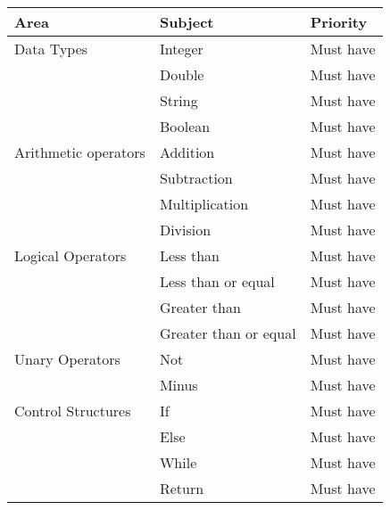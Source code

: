 \begin{table}[H]
\begin{tabular}{@{}lll@{}}
\toprule
\textbf{Area}          & \textbf{Subject}      & \textbf{Priority}               \\ \midrule
Data Types             & Integer               & Must have                       \\
                       & Double                & Must have                       \\
                       & String                & Must have                       \\
                       & Boolean               & Must have                       \\ \midrule
Arithmetic operators   & Addition              & Must have                       \\
                       & Subtraction           & Must have                       \\
                       & Multiplication        & Must have                       \\
                       & Division              & Must have                       \\ \midrule
Logical Operators      & Less than             & Must have                       \\
                       & Less than or equal    & Must have                       \\
                       & Greater than          & Must have                       \\
                       & Greater than or equal & Must have                       \\ \midrule
Unary Operators        & Not                   & Must have                       \\
                       & Minus                 & Must have                       \\ \midrule
Control Structures     & If                    & Must have                       \\
                       & Else                  & Must have                       \\
                       & While                 & Must have                       \\
                       & Return                & Must have                       \\ \midrule

\end{tabular}
\end{table}
